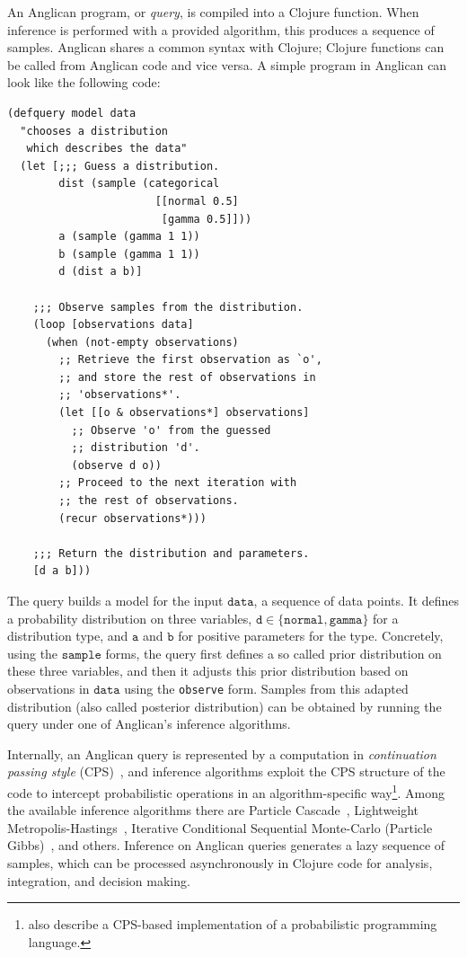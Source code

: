 \documentclass[preprint]{sigplanconf}
\begin{document}
An Anglican program, or \textit{query}, is compiled into a
Clojure function. When inference is performed with a provided
algorithm, this produces a sequence of samples. Anglican shares
a common syntax with Clojure; Clojure functions can be called
from Anglican code and vice versa. A simple program in Anglican
can look like the following code:
\begin{lstlisting}[style=default]
(defquery model data
  "chooses a distribution
   which describes the data"
  (let [;;; Guess a distribution.
        dist (sample (categorical
                       [[normal 0.5]
                        [gamma 0.5]]))
        a (sample (gamma 1 1))
        b (sample (gamma 1 1))
        d (dist a b)]

    ;;; Observe samples from the distribution.
    (loop [observations data]
      (when (not-empty observations)
        ;; Retrieve the first observation as `o',
        ;; and store the rest of observations in 
        ;; 'observations*'.
        (let [[o & observations*] observations]
          ;; Observe 'o' from the guessed 
          ;; distribution 'd'.
          (observe d o))
        ;; Proceed to the next iteration with
        ;; the rest of observations.
        (recur observations*)))

    ;;; Return the distribution and parameters.
    [d a b]))
\end{lstlisting}
The query builds a model for the input $\texttt{data}$, 
a sequence of data points.
It defines a probability distribution on three variables, 
$\texttt{d} \in \{\texttt{normal},\texttt{gamma}\}$
for a distribution type, and $\texttt{a}$ and $\texttt{b}$ for
positive parameters for the type. Concretely,
using the $\texttt{sample}$ forms, the query
first defines a so called prior distribution on these three variables,
and then it adjusts this prior distribution based on observations in
$\texttt{data}$ using the \texttt{observe} form.
Samples from this adapted distribution (also called posterior distribution)
can be obtained by running the query under one of Anglican's
inference algorithms.

Internally, an Anglican query is represented by a computation in
\textit{continuation passing style} (CPS)~\cite{AJ89}, and inference algorithms
exploit the CPS structure of the code to intercept probabilistic
operations in an algorithm-specific way\footnote{\cite{GS15}
also describe a CPS-based implementation of a probabilistic
programming language.}. Among the available
inference algorithms there are Particle Cascade~\cite{PWD+14},
Lightweight Metropolis-Hastings~\cite{WSG11}, Iterative Conditional
Sequential Monte-Carlo (Particle Gibbs)~\cite{WVM14}, and others.
Inference on Anglican queries generates a lazy sequence of
samples, which can be processed asynchronously in Clojure
code for analysis, integration, and decision making.
\end{document}
